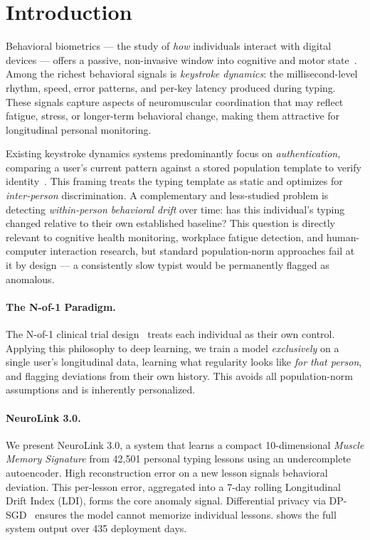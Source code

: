 \section{Introduction}
\label{sec:intro}

Behavioral biometrics — the study of \emph{how} individuals interact with
digital devices — offers a passive, non-invasive window into cognitive and
motor state~\cite{monrose2000keystroke}.
Among the richest behavioral signals is \emph{keystroke dynamics}: the
millisecond-level rhythm, speed, error patterns, and per-key latency produced
during typing.
These signals capture aspects of neuromuscular coordination that may reflect
fatigue, stress, or longer-term behavioral change, making them attractive for
longitudinal personal monitoring.

Existing keystroke dynamics systems predominantly focus on
\emph{authentication}, comparing a user's current pattern against a stored
population template to verify identity~\cite{killourhy2009comparing}.
This framing treats the typing template as static and optimizes for
\emph{inter-person} discrimination.
A complementary and less-studied problem is detecting \emph{within-person
behavioral drift} over time: has this individual's typing changed relative to
their own established baseline?
This question is directly relevant to cognitive health monitoring, workplace
fatigue detection, and human-computer interaction research, but standard
population-norm approaches fail at it by design — a consistently slow typist
would be permanently flagged as anomalous.

\paragraph{The N-of-1 Paradigm.}
The N-of-1 clinical trial design~\cite{lillie2011nof1} treats each
individual as their own control.
Applying this philosophy to deep learning, we train a model \emph{exclusively}
on a single user's longitudinal data, learning what regularity looks like
\emph{for that person}, and flagging deviations from their own history.
This avoids all population-norm assumptions and is inherently personalized.

\paragraph{NeuroLink 3.0.}
We present NeuroLink 3.0, a system that learns a compact 10-dimensional
\emph{Muscle Memory Signature} from 42,501 personal typing lessons using an
undercomplete autoencoder.
High reconstruction error on a new lesson signals behavioral deviation.
This per-lesson error, aggregated into a 7-day rolling Longitudinal Drift
Index (LDI), forms the core anomaly signal.
Differential privacy via DP-SGD~\cite{abadi2016deep} ensures the model cannot
memorize individual lessons.
 shows the full system output over 435 deployment days.

